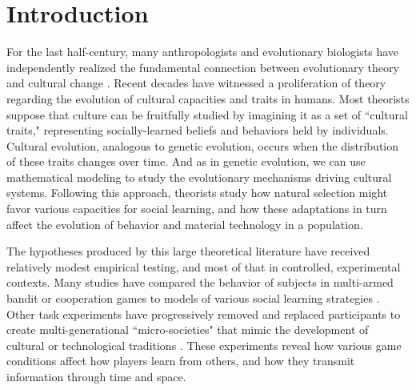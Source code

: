 


\section{Introduction}
   
For the last half-century, many anthropologists and evolutionary biologists have independently realized the fundamental connection between evolutionary theory and cultural change \citep{campbell1965variation, cavalli1981cultural, boyd1985culture, durham1992coevolution, lumsden2005genes, dawkins2006selfish}. Recent decades have witnessed a proliferation of theory regarding the evolution of cultural capacities and traits in humans. Most theorists suppose that culture can be fruitfully studied by imagining it as a set of ``cultural traits," representing socially-learned beliefs and behaviors held by individuals. Cultural evolution, analogous to genetic evolution, occurs when the distribution of these traits changes over time. And as in genetic evolution, we can use mathematical modeling to study the evolutionary mechanisms driving cultural systems. Following this approach, theorists study how natural selection might favor various capacities for social learning, and how these adaptations in turn affect the evolution of behavior and material technology in a population. 

The hypotheses produced by this large theoretical literature have received relatively modest empirical testing, and most of that in controlled, experimental contexts. Many studies have compared the behavior of subjects in multi-armed bandit or cooperation games to models of various social learning strategies \citep{mcelreath2005applying, efferson2007learning, efferson2008conformists, mcelreath2008beyond, mesoudi2008cultural, eriksson2009people, rendell2011copying}. Other task experiments have progressively removed and replaced participants to create multi-generational ``micro-societies" that mimic the development of cultural or technological traditions \citep{baum2004cultural, caldwell2008studying}.  These experiments reveal how various game conditions affect how players learn from others, and how they transmit information through time and space.

